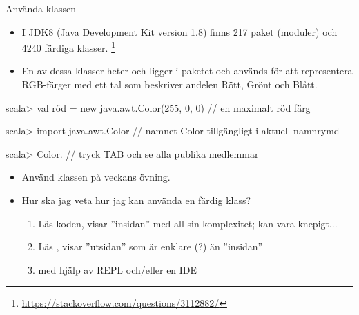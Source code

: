 \begin{Slide}{Använda klassen }\SlideFontSmall
\begin{itemize}
\item I JDK8 (Java Development Kit version 1.8) finns 217 paket (moduler) och 4240 färdiga klasser.
\footnote{\SlideFontTiny\url{https://stackoverflow.com/questions/3112882/}}

\item En av dessa klasser heter  och ligger i paketet  och används för att representera RGB-färger med ett tal som beskriver andelen Rött, Grönt och Blått.
\end{itemize}
\begin{REPL}
scala> val röd = new java.awt.Color(255, 0, 0)    //  en maximalt röd färg

scala> import java.awt.Color  // namnet Color tillgängligt i aktuell namnrymd

scala> Color.    // tryck TAB och se alla publika medlemmar
\end{REPL}
\pause
\begin{itemize}
\item Använd klassen  på veckans övning.
\item Hur ska jag veta hur jag kan använda en färdig klass?
\pause
\begin{enumerate}\SlideFontTiny
  \item Läs koden, visar ''insidan'' med all sin komplexitet; kan vara knepigt...
  \item Läs , visar ''utsidan'' som är enklare (?) än ''insidan''
  \item {} med hjälp av REPL och/eller en IDE
\end{enumerate}
\end{itemize}

\end{Slide}

